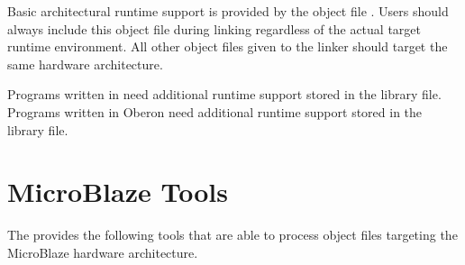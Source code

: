 Basic architectural runtime support is provided by the object file .
Users should always include this object file during linking regardless of the actual target runtime environment.
All other object files given to the linker should target the same hardware architecture.

Programs written in \cpp{} need additional runtime support stored in the  library file.
Programs written in Oberon need additional runtime support stored in the  library file.
\seecpp\seeoberon

\section{MicroBlaze Tools}

The \ecs{} provides the following tools that are able to process object files targeting the MicroBlaze hardware architecture.
\interface

\cdmibl
\cppmibl
\falmibl
\obmibl
\miblasm
\mibldism
\linkbin

\concludechapter
